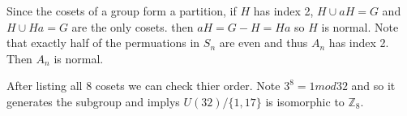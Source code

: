 \documentclass[11pt,largemargins]{homework}
\newcommand{\Z}{\mathbb{Z}}
\begin{document}
\maketitle

\question
Since the cosets of a group form a partition, if $H$ has index 2, $H \cup aH = G$ and $H \cup Ha = G$ are the only cosets. 
then $aH = G - H = Ha$ so $H$ is normal. Note that exactly half of the permuations in $S_n$ are even and thus $A_n$ has
index 2. Then $A_n$ is normal. 

\question
After listing all 8 cosets we can check thier order. Note $3^8 = 1 mod 32$ and so it generates the subgroup and implys $U(32)/\{1,17\}$ is 
isomorphic to $\Z_8$.
\end{document}
